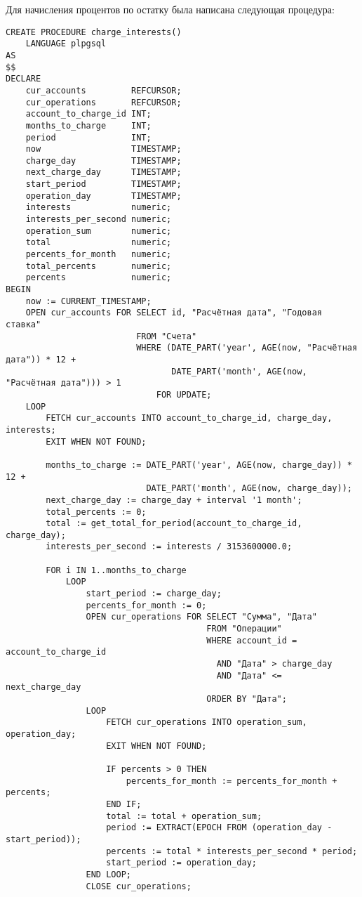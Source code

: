 \documentclass[14pt]{extarticle}
\begin{document}
    Для начисления процентов по остатку была написана следующая процедура:
    \begin{verbatim}
CREATE PROCEDURE charge_interests()
    LANGUAGE plpgsql
AS
$$
DECLARE
    cur_accounts         REFCURSOR;
    cur_operations       REFCURSOR;
    account_to_charge_id INT;
    months_to_charge     INT;
    period               INT;
    now                  TIMESTAMP;
    charge_day           TIMESTAMP;
    next_charge_day      TIMESTAMP;
    start_period         TIMESTAMP;
    operation_day        TIMESTAMP;
    interests            numeric;
    interests_per_second numeric;
    operation_sum        numeric;
    total                numeric;
    percents_for_month   numeric;
    total_percents       numeric;
    percents             numeric;
BEGIN
    now := CURRENT_TIMESTAMP;
    OPEN cur_accounts FOR SELECT id, "Расчётная дата", "Годовая ставка"
                          FROM "Счета"
                          WHERE (DATE_PART('year', AGE(now, "Расчётная дата")) * 12 +
                                 DATE_PART('month', AGE(now, "Расчётная дата"))) > 1
                              FOR UPDATE;
    LOOP
        FETCH cur_accounts INTO account_to_charge_id, charge_day, interests;
        EXIT WHEN NOT FOUND;

        months_to_charge := DATE_PART('year', AGE(now, charge_day)) * 12 +
                            DATE_PART('month', AGE(now, charge_day));
        next_charge_day := charge_day + interval '1 month';
        total_percents := 0;
        total := get_total_for_period(account_to_charge_id, charge_day);
        interests_per_second := interests / 3153600000.0;

        FOR i IN 1..months_to_charge
            LOOP
                start_period := charge_day;
                percents_for_month := 0;
                OPEN cur_operations FOR SELECT "Сумма", "Дата"
                                        FROM "Операции"
                                        WHERE account_id = account_to_charge_id
                                          AND "Дата" > charge_day
                                          AND "Дата" <= next_charge_day
                                        ORDER BY "Дата";
                LOOP
                    FETCH cur_operations INTO operation_sum, operation_day;
                    EXIT WHEN NOT FOUND;

                    IF percents > 0 THEN
                        percents_for_month := percents_for_month + percents;
                    END IF;
                    total := total + operation_sum;
                    period := EXTRACT(EPOCH FROM (operation_day - start_period));
                    percents := total * interests_per_second * period;
                    start_period := operation_day;
                END LOOP;
                CLOSE cur_operations;


\end{verbatim}
\end{document}

